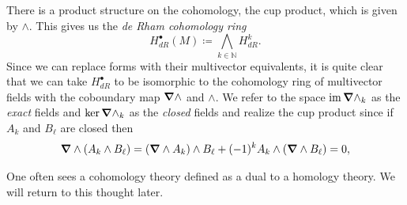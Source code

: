 \documentclass{article}
\begin{document}
There is a product structure on the cohomology, the cup product, which is given by $\wedge$. This gives us the \emph{de Rham cohomology ring}
\begin{equation}
H^\bullet_{dR}(M) \coloneqq \bigwedge_{k \in \mathbb{N}} H^k_{dR}.
\end{equation}
Since we can replace forms with their multivector equivalents, it is quite clear that we can take $H^\bullet_{dR}$ to be isomorphic to the cohomology ring of multivector fields with the coboundary map $\boldsymbol{\nabla} \wedge$ and $\wedge$. We refer to the space $\operatorname{im} \boldsymbol{\nabla} \wedge_k$ as the \emph{exact} fields and $\ker \boldsymbol{\nabla} \wedge_k$ as the \emph{closed} fields and realize the cup product since if $A_k$ and $B_\ell$ are closed then
\begin{align}
\boldsymbol{\nabla} \wedge (A_k \wedge B_\ell) = (\boldsymbol{\nabla} \wedge A_k) \wedge B_\ell + (-1)^k A_k \wedge (\boldsymbol{\nabla} \wedge B_\ell) = 0,
\end{align}

One often sees a cohomology theory defined as a dual to a homology theory. We will return to this thought later.
\end{document}
